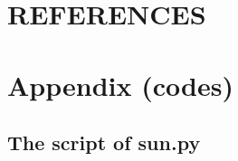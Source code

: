 \documentclass[12pt]{article}
\begin{document}
\begin{enumerate}
\end{enumerate}



\newpage
\section*{REFERENCES}
\label{sec:sec6}
\printbibliography[heading=none]

%


\newpage
\section*{Appendix (codes)}
\subsection*{The script of sun.py}
\end{document}
